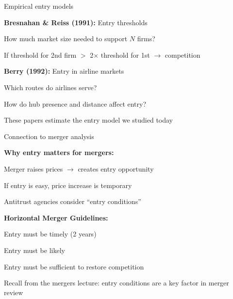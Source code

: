\documentclass[notes,11pt, aspectratio=169]{beamer}
\newenvironment{wideitemize}{\itemize\addtolength{\itemsep}{10pt}}{\enditemize}
\begin{document}
\begin{frame}{Empirical entry models}
	\begin{wideitemize}
		\item \textbf{Bresnahan \& Reiss (1991):} Entry thresholds
		\begin{wideitemize}
			\vspace{5pt}
			\item How much market size needed to support $N$ firms?
			\item If threshold for 2nd firm $>$ 2$\times$ threshold for 1st $\rightarrow$ competition
		\end{wideitemize}
		\item \textbf{Berry (1992):} Entry in airline markets
		\begin{wideitemize}
			\vspace{5pt}
			\item Which routes do airlines serve?
			\item How do hub presence and distance affect entry?
		\end{wideitemize}
		\item These papers estimate the entry model we studied today
	\end{wideitemize}
\end{frame}

\begin{frame}{Connection to merger analysis}
	\begin{wideitemize}
		\item \textbf{Why entry matters for mergers:}
		\begin{wideitemize}
			\vspace{5pt}
			\item Merger raises prices $\rightarrow$ creates entry opportunity
			\item If entry is easy, price increase is temporary
			\item Antitrust agencies consider ``entry conditions''
		\end{wideitemize}
		\item \textbf{Horizontal Merger Guidelines:}
		\begin{wideitemize}
			\vspace{5pt}
			\item Entry must be timely (2 years)
			\item Entry must be likely
			\item Entry must be sufficient to restore competition
		\end{wideitemize}
		\item Recall from the mergers lecture: entry conditions are a key factor in merger review
	\end{wideitemize}
\end{frame}
\end{document}
